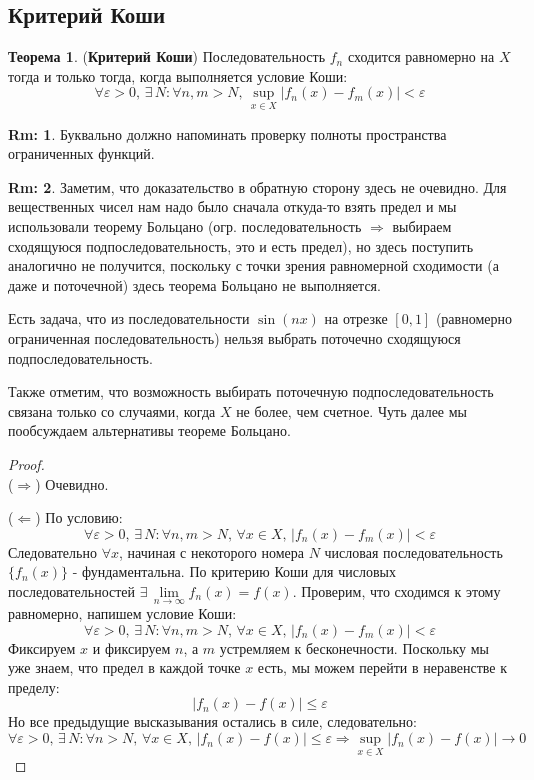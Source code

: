 \documentclass[12pt]{article}
\newcommand{\VE}{\varepsilon}
\theoremstyle{definition}
\newtheorem{rem}{Rm:}
\newtheorem{theorem}{Теорема}
\begin{document}
\subsection*{Критерий Коши}
\begin{theorem}(\textbf{Критерий Коши})
	Последовательность $f_n$ сходится равномерно на $X$ тогда и только тогда, когда выполняется условие Коши:
	$$
		\forall \VE > 0, \, \exists \, N \colon \forall n,m > N, \, \sup\limits_{x \in X}|f_n(x) - f_m(x)| < \VE
	$$
\end{theorem}
\begin{rem}
	Буквально должно напоминать проверку полноты пространства ограниченных функций.
\end{rem}
\begin{rem}
	Заметим, что доказательство в обратную сторону здесь не очевидно. Для вещественных чисел нам надо было сначала откуда-то взять предел и мы использовали теорему Больцано (огр. последовательность $\Rightarrow$ выбираем сходящуюся подпоследовательность, это и есть предел), но здесь поступить аналогично не получится, поскольку с точки зрения равномерной сходимости (а даже и поточечной) здесь теорема Больцано не выполняется. 
	
	Есть задача, что из последовательности $\sin{(nx)}$ на отрезке $[0,1]$ (равномерно ограниченная последовательность) нельзя выбрать поточечно сходящуюся подпоследовательность.

	Также отметим, что возможность выбирать поточечную подпоследовательность связана только со случаями, когда $X$ не более, чем счетное. Чуть далее мы пообсуждаем альтернативы теореме Больцано.
\end{rem}

\begin{proof}\hfill\\
	($\Rightarrow$) Очевидно.
	
	($\Leftarrow$) По условию:
	$$
		\forall \VE > 0, \, \exists \, N \colon \forall n,m > N, \, \forall x \in X, \, |f_n(x) - f_m(x)| < \VE
	$$
	Следовательно $\forall x$, начиная с некоторого номера $N$ числовая последовательность $\{f_n(x)\}$ - фундаментальна. По критерию Коши для числовых последовательностей $\exists \, \lim\limits_{n \to \infty}f_n(x) = f(x)$. Проверим, что сходимся к этому равномерно, напишем условие Коши:
	$$
		\forall \VE > 0, \, \exists \, N \colon \forall n,m > N, \, \forall x \in X, \, |f_n(x) - f_m(x)| < \VE
	$$
	Фиксируем $x$ и фиксируем $n$, а $m$ устремляем к бесконечности. Поскольку мы уже знаем, что предел в каждой точке $x$ есть, мы можем перейти в неравенстве к пределу:
	$$
		|f_n(x) - f(x)| \leq \VE
	$$ 
	Но все предыдущие высказывания остались в силе, следовательно:
	$$
		\forall \VE > 0, \, \exists \, N \colon \forall n > N, \, \forall x \in X, \, |f_n(x) - f(x)| \leq \VE \Rightarrow \sup\limits_{x \in X}|f_n(x) - f(x)| \to 0
	$$
\end{proof}
\end{document}
